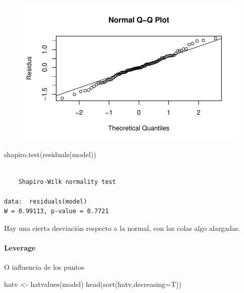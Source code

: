 \documentclass[
  letterpaper,
  DIV=11,
  numbers=noendperiod]{scrartcl}
\let\oldparagraph\paragraph
\renewcommand{\paragraph}[1]{\oldparagraph{#1}\mbox{}}
\newenvironment{Shaded}{\begin{snugshade}}{\end{snugshade}}
\newcommand{\AttributeTok}[1]{\textcolor[rgb]{0.40,0.45,0.13}{#1}}
\newcommand{\FunctionTok}[1]{\textcolor[rgb]{0.28,0.35,0.67}{#1}}
\newcommand{\NormalTok}[1]{\textcolor[rgb]{0.00,0.23,0.31}{#1}}
\newcommand{\OtherTok}[1]{\textcolor[rgb]{0.00,0.23,0.31}{#1}}
\begin{document}
\begin{figure}[H]

{\centering \includegraphics{Regresion-Lineal_files/figure-pdf/unnamed-chunk-17-1.pdf}

}

\end{figure}

\begin{Shaded}
\begin{Highlighting}[]
\FunctionTok{shapiro.test}\NormalTok{(}\FunctionTok{residuals}\NormalTok{(model))}
\end{Highlighting}
\end{Shaded}

\begin{verbatim}

    Shapiro-Wilk normality test

data:  residuals(model)
W = 0.99113, p-value = 0.7721
\end{verbatim}

Hay una cierta desviación respecto a la normal, con las colas algo
alargadas.

\hypertarget{leverage}{%
\paragraph{Leverage}\label{leverage}}

O influencia de los puntos

\begin{Shaded}
\begin{Highlighting}[]
\NormalTok{hatv }\OtherTok{\textless{}{-}} \FunctionTok{hatvalues}\NormalTok{(model)}
\FunctionTok{head}\NormalTok{(}\FunctionTok{sort}\NormalTok{(hatv,}\AttributeTok{decreasing=}\NormalTok{T))}
\end{Highlighting}
\end{Shaded}
\end{document}
